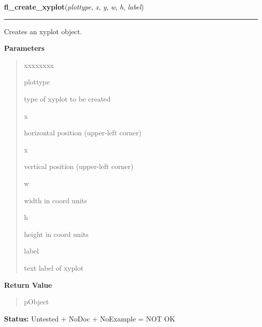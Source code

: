 \hspace{.8\funcindent}\begin{boxedminipage}{\funcwidth}

    \raggedright \textbf{fl\_create\_xyplot}(\textit{plottype}, \textit{x}, \textit{y}, \textit{w}, \textit{h}, \textit{label})

    \vspace{-1.5ex}

    \rule{\textwidth}{0.5\fboxrule}
\setlength{\parskip}{2ex}
    Creates an xyplot object.

\setlength{\parskip}{1ex}
      \textbf{Parameters}
      \vspace{-1ex}

      \begin{quote}
        \begin{Ventry}{xxxxxxxx}

          \item[plottype]

          type of xyplot to be created

          \item[x]

          horizontal position (upper-left corner)

          \item[x]

          vertical position (upper-left corner)

          \item[w]

          width in coord units

          \item[h]

          height in coord units

          \item[label]

          text label of xyplot

        \end{Ventry}

      \end{quote}

      \textbf{Return Value}
    \vspace{-1ex}

      \begin{quote}
      pObject

      \end{quote}

\textbf{Status:} Untested + NoDoc + NoExample = NOT OK



    \end{boxedminipage}

